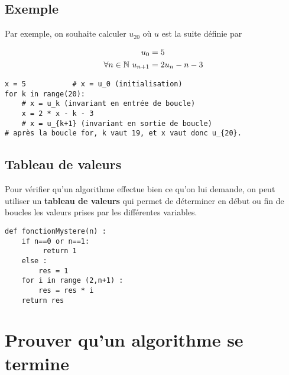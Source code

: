 \subsection{Exemple}

\begin{exemple}
Par exemple, on souhaite calculer $u_{20}$ où $u$ est la suite définie par

\begin{align*}
  u_{0} & = 5\\
  \forall n\in\mathbb{N}\ u_{n+1} &= 2u_{n}- n - 3\\
\end{align*}


\begin{lstlisting}
x = 5			# x = u_0 (initialisation)
for k in range(20): 	
    # x = u_k (invariant en entrée de boucle)
    x = 2 * x - k - 3	
    # x = u_{k+1} (invariant en sortie de boucle)	
# après la boucle for, k vaut 19, et x vaut donc u_{20}.
\end{lstlisting}
\end{exemple}

\subsection{Tableau de valeurs}

\begin{defi}
Pour vérifier qu'un algorithme effectue bien ce qu'on lui demande, on peut utiliser un \textbf{tableau de valeurs} qui permet de déterminer en début ou fin de boucles les valeurs prises par les différentes variables.
\end{defi}


\begin{exemple}
\begin{lstlisting}
def fonctionMystere(n) :
    if n==0 or n==1:
         return 1
    else :
        res = 1
    for i in range (2,n+1) :
        res = res * i
    return res
\end{lstlisting}



\end{exemple}


\section{Prouver qu'un algorithme se termine}

